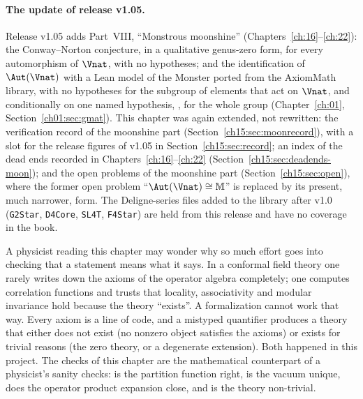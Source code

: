 \paragraph{The update of release v1.05.} Release v1.05 adds Part~VIII, ``Monstrous moonshine''
(Chapters~\ref{ch:16}--\ref{ch:22}): the Conway--Norton conjecture, in a qualitative genus-zero form, for every
automorphism of $\Vnat$, with no hypotheses; and the identification of $\Aut(\Vnat)$ with a Lean model of the Monster
ported from the AxiomMath library, with no hypotheses for the subgroup of elements that act on $\Vnat$, and conditionally
on one named hypothesis, , for the whole group (Chapter~\ref{ch:01}, Section~\ref{ch01:sec:gmat}). This
chapter was again extended, not rewritten: the verification record of the moonshine part
(Section~\ref{ch15:sec:moonrecord}), with a slot for the release figures of v1.05 in Section~\ref{ch15:sec:record}; an
index of the dead ends recorded in Chapters~\ref{ch:16}--\ref{ch:22} (Section~\ref{ch15:sec:deadends-moon}); and the open
problems of the moonshine part (Section~\ref{ch15:sec:open}), where the former open problem ``$\Aut(\Vnat)\cong\mathbb M$''
is replaced by its present, much narrower, form. The Deligne-series files added to the library after v1.0 (\texttt{G2Star},
\texttt{D4Core}, \texttt{SL4T}, \texttt{F4Star}) are held from this release and have no
coverage in the book.

\begin{remark}\label{ch15:rem:physics}
A physicist reading this chapter may wonder why so much effort goes into checking that a
statement means what it says. In a conformal field theory one rarely writes down the axioms of
the operator algebra completely; one computes correlation functions and trusts that locality,
associativity and modular invariance hold because the theory ``exists''. A formalization cannot
work that way. Every axiom is a line of code, and a mistyped quantifier produces a theory that
either does not exist (no nonzero object satisfies the axioms) or exists for trivial reasons (the
zero theory, or a degenerate extension). Both happened in this project. The checks of this chapter
are the mathematical counterpart of a physicist's sanity checks: is the partition function right,
is the vacuum unique, does the operator product expansion close, and is the theory non-trivial.
\end{remark}

